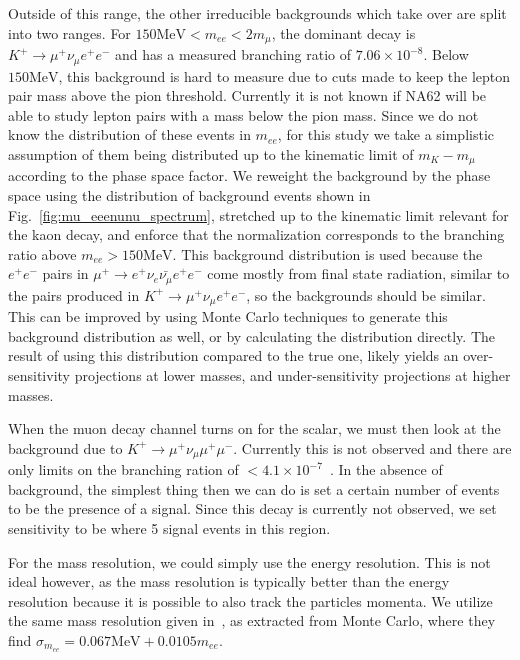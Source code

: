 Outside of this range, the other irreducible backgrounds which take over are split into two ranges.
For $150\textrm{MeV} < m_{ee} < 2m_\mu$, the dominant decay is $K^+ \rightarrow \mu^+ \nu_\mu e^+ e^-$ and has a measured branching ratio of $7.06 \times 10^{-8}$.
Below $150\textrm{MeV}$, this background is hard to measure due to cuts made to keep the lepton pair mass above the pion threshold.
Currently it is not known if NA62 will be able to study lepton pairs with a mass below the pion mass.
Since we do not know the distribution of these events in $m_{ee}$, for this study we take a simplistic assumption of them being distributed up to the kinematic limit of $m_K - m_\mu$ according to the phase space factor.
We reweight the background by the phase space using the distribution of background events shown in Fig.\ \ref{fig:mu_eeenunu_spectrum}, stretched up to the kinematic limit relevant for the kaon decay, and enforce that the normalization corresponds to the branching ratio above $m_{ee} > 150\textrm{MeV}$.
This background distribution is used because the $e^+ e^-$ pairs in $\mu^+ \rightarrow e^+ \nu_e \bar{\nu_\mu} e^+ e^-$ come mostly from final state radiation, similar to the pairs produced in $K^+ \rightarrow \mu^+ \nu_\mu e^+ e^-$, so the backgrounds should be similar.
This can be improved by using Monte Carlo techniques to generate this background distribution as well, or by calculating the distribution directly.
The result of using this distribution compared to the true one, likely yields an over-sensitivity projections at lower masses, and under-sensitivity projections at higher masses.

When the muon decay channel turns on for the scalar, we must then look at the background due to $K^+ \rightarrow \mu^+ \nu_\mu \mu^+ \mu^-$.
Currently this is not observed and there are only limits on the branching ration of $< 4.1 \times 10^{-7}$~\cite{Agashe:2014kda}.
In the absence of background, the simplest thing then we can do is set a certain number of events to be the presence of a signal.
Since this decay is currently not observed, we set sensitivity to be where 5 signal events in this region.

For the mass resolution, we could simply use the energy resolution.
This is not ideal however, as the mass resolution is typically better than the energy resolution because it is possible to also track the particles momenta.
We utilize the same mass resolution given in~\cite{Batley:2015lha}, as extracted from Monte Carlo, where they find $\sigma_{m_{ee}} = 0.067\textrm{MeV} + 0.0105 m_{ee}$.

